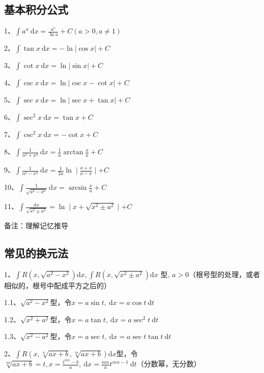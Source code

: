 \subsection{基本积分公式}

1、$\int a^{x} \mathrm{~d} x=\frac{a^{x}}{\ln a}+C(a>0, a \neq 1)$

2、$\int \tan x \mathrm{~d} x=-\ln |\cos x|+C$

3、$\int \cot x \mathrm{~d} x=\ln |\sin x|+C$

4、$\int \csc x \mathrm{~d} x=\ln |\csc x-\cot x|+C$

5、$\int \sec x \mathrm{~d} x=\ln |\sec x+\tan x|+C$

6、$\int \sec ^{2} x \mathrm{~d} x=\tan x+C$

7、$\int \csc ^{2} x \mathrm{~d} x=-\cot x+C$

8、$\int \frac{1}{a^{2}+x^{2}} \mathrm{~d} x=\frac{1}{a} \arctan \frac{x}{a}+C$

9、$\int \frac{1}{a^{2}-x^{2}} \mathrm{~d} x=\frac{1}{2 a} \ln \mid \frac{a+x}{a-x} \mid+C$

10、$\int \frac{1}{\sqrt{a^{2}-x^{2}}} \mathrm{~d} x=\arcsin \frac{x}{a}+C$

11、$\int \frac{\mathrm{d} x}{\sqrt{x^{2} \pm a^{2}}}=\ln \mid x+\sqrt{x^{2} \pm a^{2}} \mid+ C$

备注：理解记忆推导



\subsection{常见的换元法}

1、$\int R\left(x, \sqrt{a^{2}-x^{2}}\right) \mathrm{d} x, \int R\left(x, \sqrt{x^{2} \pm a^{2}}\right) \mathrm{d} x \text { 型, } a>0$（根号型的处理，或者相似的，根号中配成平方之后的）

1.1、$\sqrt{a^{2}-x^{2}}$型，令$x=a \sin t, \mathrm{~d} x=a \cos t \mathrm{~d} t$

1.2、$\sqrt{x^{2}+a^{2}}$型，令$x=a \tan t, \mathrm{~d} x=a \sec ^{2} t \mathrm{~d} t$

1.3、$\sqrt{x^{2}-a^{2}}$型，令$x=a \sec t, \mathrm{~d} x=a \sec t \tan t \mathrm{~d} t$

2、$\int R(x, \sqrt[n]{a x+b}, \sqrt[m]{a x+b}) \mathrm{d} x$型，令$\sqrt[n n]{a x+b}=t, x=\frac{t^{m n}-b}{a}, \mathrm{~d} x=\frac{m n}{a} t^{m n-1} \mathrm{~d} t$（分数幂，无分数）

